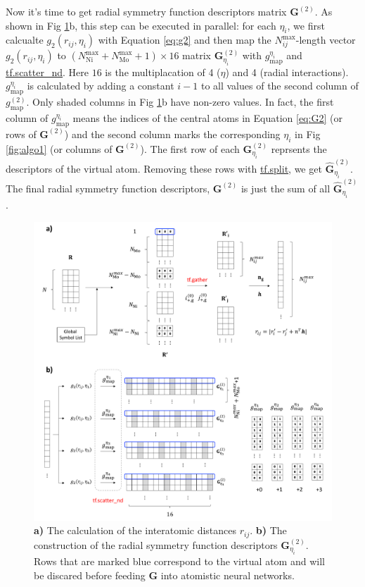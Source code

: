 \documentclass[preprint]{revtex4-2}
\begin{document}
Now it's time to get radial symmetry function descriptors matrix 
$\mathbf{G}^{(2)}$. 
As shown in Fig \ref{fig:algo3}b, this step can be executed in parallel: 
for each $\eta_i$, we first calcualte $g_2(r_{ij}, \eta_i)$ with 
Equation \ref{eq:g2} and then map the $N_{ij}^{\mathrm{max}}$-length vector 
$g_2(r_{ij}, \eta_i)$ to 
$(N_{\mathrm{Ni}}^{\mathrm{max}}+N_{\mathrm{Mo}}^{\mathrm{max}}+1) \times 16$ 
matrix $\mathbf{G}^{(2)}_{\eta_i}$ with $g^{\eta_i}_{\mathrm{map}}$ and 
\href{https://www.tensorflow.org/versions/r1.12/api_docs/python/tf/scatter_nd}
{tf.scatter\_nd}. Here $16$ is the multiplacation of 4 ($\eta$) and 4 
(radial interactions). 
$g^{\eta_i}_{\mathrm{map}}$ is calculated by adding a constant
$i - 1$ to all values of the second column of $g^{(2)}_{\mathrm{map}}$. Only 
shaded columns in Fig \ref{fig:algo3}b have non-zero values.
In fact, the first column of $g^{\eta_i}_{\mathrm{map}}$ means the indices of 
the central atoms in Equation \ref{eq:G2} (or rows of $\mathbf{G}^{(2)}$) and 
the second column marks the corresponding $\eta_i$ in Fig \ref{fig:algo1} (or 
columns of $\mathbf{G}^{(2)}$).
The first row of each $\mathbf{G}^{(2)}_{\eta_i}$ reprsents the descriptors of 
the virtual atom. Removing these rows with
\href{https://www.tensorflow.org/versions/r1.12/api_docs/python/tf/split}
{tf.split}, we get $\hat{\mathbf{G}}^{(2)}_{\eta_i}$.
The final radial symmetry function descriptors, $\mathbf{G}^{(2)}$ is just the 
sum of all $\hat{\mathbf{G}}^{(2)}_{\eta_i}$.

\begin{figure}[h!]
\centering
\includegraphics[scale=0.5]{figures/Fig3-G2.pdf}
\caption{\label{fig:algo3} 
\textbf{a)} The calculation of the interatomic distances $r_{ij}$.
\textbf{b)} The construction of the radial symmetry function descriptors 
$\mathbf{G}^{(2)}_{\eta_i}$. Rows that are marked blue correspond to the virtual 
atom and will be discared before feeding $\mathbf{G}$ into atomistic neural 
networks.
}
\end{figure}
\end{document}
